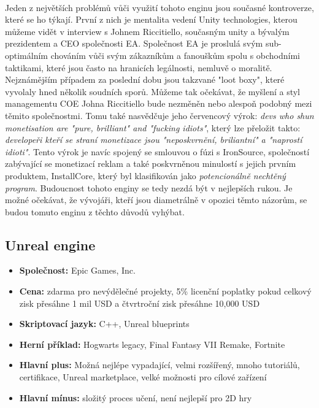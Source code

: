 \paragraph{}
	Jeden z největších problémů vůči využití tohoto enginu jsou současné kontroverze, které se ho týkají.
	První z nich je mentalita vedení Unity technologies, kterou můžeme vidět v interview s Johnem Riccitiello, současným  unity a bývalým prezidentem a \ac{CEO} společnosti EA.
	Společnost EA je proslulá svým sub-optimálním chováním vůči svým zákazníkům a fanouškům spolu s obchodními taktikami, které jsou často na hranicích legálnosti, nemluvě o moralitě.
	Nejznámějším případem za poslední dobu jsou takzvané "loot boxy"\cite{loot_box_wiki}, které vyvolaly hned několik soudních sporů.
	Můžeme tak očekávat, že myšlení a styl managementu COE Johna Riccitiello bude nezměněn nebo alespoň podobný mezi těmito společnostmi.
	Tomu také nasvědčuje jeho červencový výrok: \textit{devs who shun monetisation are "pure, brilliant" and "fucking idiots"}\cite{John_Riccitiello_interview}, který lze přeložit takto: \textit{developeři kteří se straní monetizace jsou "neposkvrnění, briliantní" a "naprostí idioti"}.
	Tento výrok je navíc spojený se smlouvou o fúzi s IronSource\cite{unity_ironSource_merger}, společností zabývající se monetizací reklam a také poskvrněnou minulostí  s jejich prvním produktem, InstallCore\cite{installCore_wiki}, který byl klasifikován jako \textit{potencionálně nechtěný program}\cite{PUP_wiki}.
	Budoucnost tohoto enginy se tedy nezdá být v nejlepších rukou.
	Je možné očekávat, že vývojáři, kteří jsou diametrálně v opozici těmto názorům, se budou tomuto enginu z těchto důvodů vyhýbat.

\subsection{Unreal engine}

\begin{itemize}
	\item \textbf{Společnost: } Epic Games, Inc.
	\item \textbf{Cena: } zdarma pro nevýdělečné projekty, 5\% licenční poplatky pokud celkový zisk přesáhne 1 mil USD a čtvrtroční zisk přesáhne 10,000 USD
	\item \textbf{Skriptovací jazyk: } C++, Unreal blueprints
	\item \textbf{Herní příklad: } Hogwarts legacy, Final Fantasy VII Remake,  Fortnite
	\item \textbf{Hlavní plus: } Možná nejlépe vypadající, velmi rozšířený, mnoho tutoriálů, certifikace, Unreal marketplace, velké možnosti pro cílové zařízení
	\item \textbf{Hlavní mínus: } složitý proces učení, není nejlepší pro 2D hry
\end{itemize}

